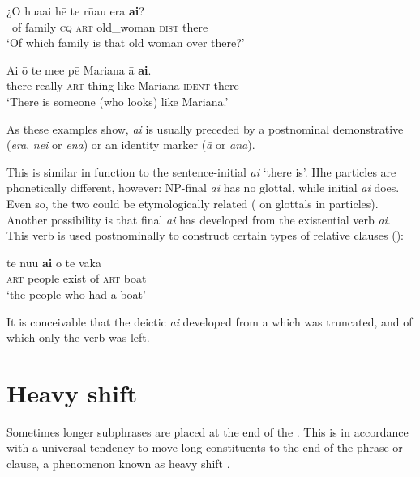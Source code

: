 \ea\label{ex:5.160}
\gll ¿O hua{\ꞌ}ai hē te rū{\ꞌ}au era \textbf{ai}? \\
~of family \textsc{cq} \textsc{art} old\_woman \textsc{dist} there \\

\glt 
‘Of which family is that old woman over there?’ \textstyleExampleref{[R413.305]} 
\z

\ea\label{ex:5.161}
\gll {\ꞌ}Ai {\ꞌ}ō te me{\ꞌ}e pē Mariana {\ꞌ}ā \textbf{ai}. \\
there really \textsc{art} thing like Mariana \textsc{ident} there \\

\glt
‘There is someone (who looks) like Mariana.’ \textstyleExampleref{[R415.423]} 
\z

As these examples show, \textit{ai} is usually preceded by a postnominal demonstrative (\textit{era}, \textit{nei} or \textit{ena}) or an identity marker (\textit{{\ꞌ}ā} or \textit{{\ꞌ}ana}). 

This  is similar in function to the sentence-initial  \textit{{\ꞌ}ai} ‘there is’. Hhe particles are phonetically different, however: NP{}-final \textit{ai} has no glottal, while initial \textit{{\ꞌ}ai} does. Even so, the two could be etymologically related ( on glottals in particles). Another possibility is that final \textit{ai} has developed from the existential verb \textit{ai}. This verb is used postnominally to construct certain types of relative clauses ():

\ea\label{ex:5.162}
\gll te nu{\ꞌ}u \textbf{ai} o te vaka\\
\textsc{art} people exist of \textsc{art} boat\\

\glt
‘the people who had a boat’ \textstyleExampleref{[R200.086]} 
\z
	
It is conceivable that the deictic  \textit{ai} developed from a  which was truncated, and of which only the verb was left.

\section{Heavy shift}\label{sec:5.11}
Sometimes longer subphrases are placed at the end of the . This is in accordance with a universal tendency to move long constituents to the end of the phrase or clause, a phenomenon known as heavy shift \citep[326]{Payne1997}.

